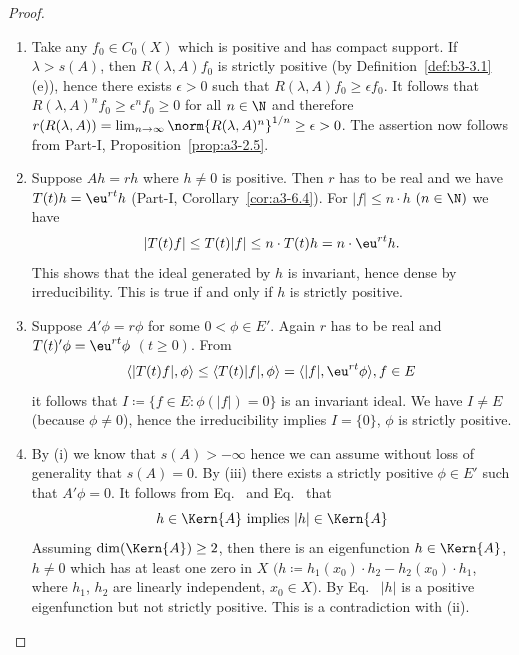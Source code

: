\begin{proof} 
\begin{enumerate}[\upshape (i), wide, labelindent=.25em]
	\item 
	Take any $f_{0} \in C_{0}(X)$ which is positive and has compact support.
	If\/ $\lambda > s(A)$, then $R(\lambda,A)f_{0}$ is strictly positive (by Definition~\ref{def:b3-3.1}\,(e)), hence there exists $\epsilon > 0$ such that $R(\lambda,A)f_{0} \geq \epsilon f_{0}$.
	It follows that $R(\lambda,A)^nf_{0} \geq \epsilon^nf_{0} \geq 0$ for all $n \in \N$ and therefore
	$r(R(\lambda,A)) = \lim_{n \to \infty}\norm{R(\lambda,A)^{n}}^{1/n} \geq \epsilon > 0 $.
	The assertion now follows from Part-I, Proposition~\ref{prop:a3-2.5}.	

	\item 
	Suppose $Ah = rh$ where $h \neq 0$ is positive.
	Then $r$ has to be real and we have $T(t)h = \eu^{rt}h$ (Part-I, Corollary~\ref{cor:a3-6.4}).
	For $|f| \leq n\cdot h$ $(n \in \N)$ we have
	\begin{equation}\label{eq:b3-3.2}
		|T(t)f| \leq T(t)|f| \leq n\cdot T(t)h = n\cdot \eu^{rt}h.		
	\end{equation}
		This shows that the ideal generated by $h$ is invariant, hence dense by irreducibility.
	This is true if and only if\/ $h$ is strictly positive.
	
	\item 
	Suppose $A'\phi = r\phi$ for some $0 < \phi \in E'$.
	Again $r$ has to be real and $T(t)'\phi = \eu^{rt}\phi$ $(t \geq 0)$.
	From
	\begin{equation}\label{eq:b3-3.3}
	\langle|T(t)f|,\phi\rangle \leq \langle T(t)|f|,\phi\rangle = \langle|f|,\eu^{rt}\phi\rangle, f \in E			
	\end{equation}
	it follows that $I \coloneq \{f \in E \colon \phi(|f|) = 0\}$ is an invariant ideal.
	We have $I \neq E$ (because $\phi \neq 0$), hence the irreducibility implies $I = \{0\}$, \ie $\phi$ is strictly positive.
	
	\item 
	By (i) we know that $s(A) > -\infty$ hence we can assume without loss of generality that $s(A) = 0$.
	By (iii) there exists a strictly positive $\phi \in E'$ such that $A'\phi = 0$.
	It follows from Eq.~ and Eq.~ that
	\begin{equation}\label{eq:b3-3.4}
	h \in \Kern{A} \text{ implies } |h| \in \Kern{A}
	\end{equation}
	Assuming $\dim(\Kern{A}) \geq 2$, then there is an eigenfunction $h \in \Kern{A}$, $h \neq 0$ which has at least one zero in $X$ $(h \coloneq h_{1}(x_{0})\cdot h_{2} - h_{2}(x_{0})\cdot h_{1}$, where $h_{1}$, $h_{2}$ are linearly independent, $x_{0} \in X)$.
	By Eq.~ $|h|$ is a positive eigenfunction but not strictly positive.
	This is a contradiction with (ii).
	

\end{enumerate}
\end{proof}
